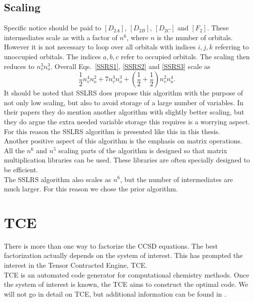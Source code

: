 \documentclass[a4paper,norsk,11pt,twoside]{report}
\begin{document}
\subsection{Scaling}
Specific notice should be paid to $[D_{2A}]$, $[D_{2B}]$, $[D_{2C}]$
and $[F_{2}]$. These intermediates scale as with a factor of $n^6$,
where $n$ is the number of orbitals. However it is not necessary to loop
over all orbitals with indices $i,j,k$ referring to unoccupied orbitals. The indices
$a,b,c$ refer to occupied orbitals. The scaling then reduces to $n_v^3
n_o^3$. Overall Eqs.~\eqref{SSRS1}, \eqref{SSRS2} and \eqref{SSRS3}
scale as
\begin{equation}
\frac{1}{2} n_v^4 n_o^2 + 7 n_v^3 n_o^3 + \left( \frac{1}{2} + \frac{1}{2} \right) n_v^2 n_o^4 . 
\end{equation} 
It should be noted that SSLRS does propose this algorithm with the
purpose of not only low scaling, but also to avoid storage of a large number
of variables. In their papers they do mention another algorithm with
slightly better scaling, but they do argue the extra needed variable
storage this requires is a worrying aspect. For this reason the SSLRS
algorithm is presented like this in this thesis.\\

Another positive aspect of this algorithm is the emphasis on matrix
operations. All the $n^6$ and $n^5$ scaling parts of the algorithm is
designed so that matrix multiplication libraries can be used. These
libraries are often specially designed to be efficient. \\

The SSLRS algorithm also scales as $n^6$, but the number of
intermediates are much larger. For this reason we chose the prior
algorithm.

\section{TCE}
There is more than one way to factorize the CCSD equations. The best
factorization actually depends on the system of interest. This has
prompted the interest in the Tensor Contracted Engine, TCE. \\

TCE is an automated code generator for computational chemistry
methods. Once the system of interest is known, the TCE aims to
construct the optimal code. We will not go in detail on TCE, but
additional information can be found in \cite{tce_citation_numbah_10}.
\end{document}
